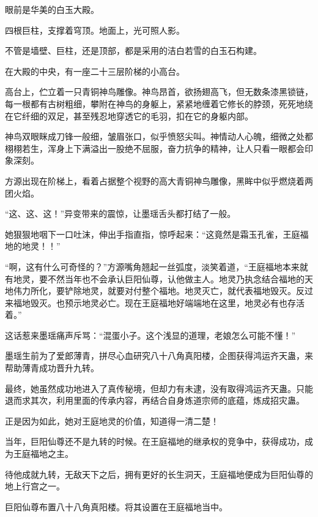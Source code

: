 
\begin{this_body}



眼前是华美的白玉大殿。

四根巨柱，支撑着穹顶。地面上，光可照人影。

不管是墙壁、巨柱，还是顶部，都是采用的洁白若雪的白玉石构建。

在大殿的中央，有一座二十三层阶梯的小高台。

高台上，伫立着一只青铜神鸟雕像。神鸟昂首，欲扬翅高飞，但无数条漆黑锁链，每一根都有古树粗细，攀附在神鸟的身躯上，紧紧地缠着它修长的脖颈，死死地绕在它纤细的双足，甚至残忍地穿透它的毛羽，扣在它的身躯内部。

神鸟双眼眯成刀锋一般细，皱眉张口，似乎愤怒尖叫。神情动人心魄，细微之处都栩栩若生，浑身上下满溢出一股绝不屈服，奋力抗争的精神，让人只看一眼都会印象深刻。

方源出现在阶梯上，看着占据整个视野的高大青铜神鸟雕像，黑眸中似乎燃烧着两团火焰。

“这、这、这！”异变带来的震惊，让墨瑶舌头都打结了一般。

她狠狠地咽下一口吐沫，伸出手指直指，惊呼起来：“这竟然是霜玉孔雀，王庭福地的地灵！！”

“啊，这有什么可奇怪的？”方源嘴角翘起一丝弧度，淡笑着道，“王庭福地本来就有地灵，要不然当年也不会承认巨阳仙尊，认他做主人。地灵乃执念结合福地的天地伟力所化，要铲除地灵，就要对付整个福地。地灵灭亡，就代表福地毁灭。反过来福地毁灭。也预示地灵必亡。现在王庭福地好端端地在这里，地灵必有也存活着。”

这话惹来墨瑶痛声斥骂：“混蛋小子。这个浅显的道理，老娘怎么可能不懂！”

墨瑶生前为了爱郎薄青，拼尽心血研究八十八角真阳楼，企图获得鸿运齐天蛊，来帮助薄青成功晋升九转。

最终，她虽然成功地进入了真传秘境，但却力有未逮，没有取得鸿运齐天蛊。只能退而求其次，利用里面的传承内容，再结合自身炼道宗师的底蕴，炼成招灾蛊。

正是因为如此，她对王庭地灵的价值，知道得一清二楚！

当年，巨阳仙尊还不是九转的时候。在王庭福地的继承权的竞争中，获得成功，成为王庭福地之主。

待他成就九转，无敌天下之后，拥有更好的长生洞天，王庭福地便成为巨阳仙尊的地上行宫之一。

巨阳仙尊布置八十八角真阳楼。将其设置在王庭福地当中。


\end{this_body}
